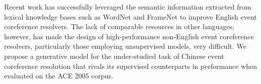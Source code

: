 Recent work has successfully leveraged the semantic information extracted from lexical knowledge bases such as WordNet and FrameNet to improve English event coreference resolvers. The lack of comparable resources in other languages, however, has made the design of high-performance non-English event coreference resolvers, particularly those employing unsupervised models, very difficult. We propose a generative model for the under-studied task of Chinese event coreference resolution that rivals its supervised counterparts in performance when evaluated on the ACE 2005 corpus.
